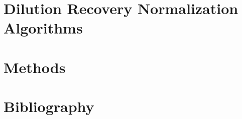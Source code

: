 \documentclass[english]{article}
\begin{document}
\section{Dilution Recovery Normalization Algorithms}
\section{Methods}
\section{Bibliography}



\end{document}

